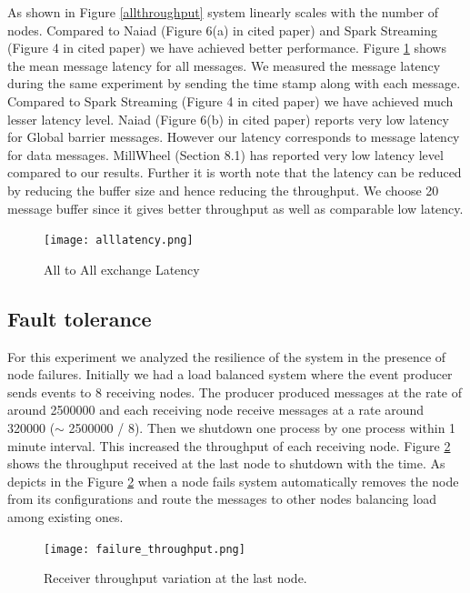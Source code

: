 As shown in Figure \ref{allthroughput} system linearly scales with the number of nodes.  Compared to Naiad (Figure 6(a) in cited paper) \cite{murray2013naiad} and Spark Streaming (Figure 4 in cited paper) \cite{zaharia2013discretized} we have achieved better performance.  Figure \ref{alllatency} shows the mean message latency for all messages. We measured the message latency during the same experiment by sending the time stamp along with each message. Compared to Spark Streaming (Figure 4 in cited paper) \cite{zaharia2013discretized} we have achieved much lesser latency level. Naiad (Figure 6(b) in cited paper) \cite{murray2013naiad} reports very low latency for Global barrier messages. However our latency corresponds to message latency for data messages. MillWheel (Section 8.1) \cite{akidau2013millwheel} has reported very low latency level compared to our results. Further it is worth note that the latency can be reduced by reducing the buffer size and hence reducing the throughput. We choose 20 message buffer since it gives better throughput as well as comparable low latency.

\begin{figure}[!t]
        \centering
        \texttt{[image: alllatency.png]}
        \caption{All to All exchange Latency}
        \label{alllatency}
\end{figure}


\subsection{Fault tolerance}
For this experiment we analyzed the resilience of the system in the presence of node failures. Initially we had a load balanced system where the event producer sends events to 8 receiving nodes. The producer produced messages at the rate of around 2500000 and each receiving node receive messages at a rate around 320000 ($\sim$ 2500000 / 8). Then we shutdown one process by one process within 1 minute interval. This increased the throughput of each receiving node. Figure \ref{rthroughput} shows the throughput received at the last node to shutdown with the time. As depicts in the Figure \ref{rthroughput} when a node fails system automatically removes the node from its configurations and route the messages to other nodes balancing load among existing ones.

\begin{figure}[!t]
        \centering
        \texttt{[image: failure\_throughput.png]}
        \caption{Receiver throughput variation at the last node.}
        \label{rthroughput}
\end{figure}
